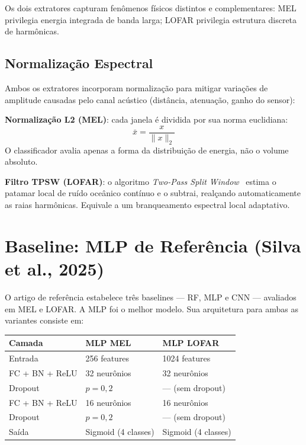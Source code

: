 \documentclass[a4paper,12pt]{article}
\begin{document}
Os dois extratores capturam fenômenos físicos distintos e complementares: MEL privilegia energia integrada de banda larga; LOFAR privilegia estrutura discreta de harmônicas.

\subsection{Normalização Espectral}

Ambos os extratores incorporam normalização para mitigar variações de amplitude causadas pelo canal acústico (distância, atenuação, ganho do sensor):

\textbf{Normalização L2 (MEL)}: cada janela é dividida por sua norma euclidiana:
\begin{equation}
    \bar{x} = \frac{x}{\|x\|_2}
\end{equation}
O classificador avalia apenas a forma da distribuição de energia, não o volume absoluto.

\textbf{Filtro TPSW (LOFAR)}: o algoritmo \textit{Two-Pass Split Window}~\cite{nielsen1994} estima o patamar local de ruído oceânico contínuo e o subtrai, realçando automaticamente as raias harmônicas. Equivale a um branqueamento espectral local adaptativo.

\section{Baseline: MLP de Referência (Silva et al., 2025)}

O artigo de referência estabelece três baselines — RF, MLP e CNN — avaliados em MEL e LOFAR. A MLP foi o melhor modelo. Sua arquitetura para ambas as variantes consiste em:

\begin{center}
\begin{tabular}{lll}
\toprule
\textbf{Camada} & \textbf{MLP MEL} & \textbf{MLP LOFAR} \\
\midrule
Entrada        & 256 features    & 1024 features \\
FC + BN + ReLU & 32 neurônios    & 32 neurônios \\
Dropout        & $p = 0{,}2$     & --- (sem dropout) \\
FC + BN + ReLU & 16 neurônios    & 16 neurônios \\
Dropout        & $p = 0{,}2$     & --- (sem dropout) \\
Saída          & Sigmoid (4 classes) & Sigmoid (4 classes) \\
\bottomrule
\end{tabular}
\end{center}
\end{document}
